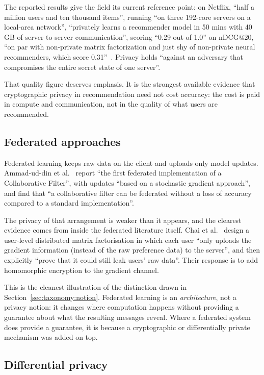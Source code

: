 The reported results give the field its current reference point: on Netflix, ``half a million
users and ten thousand items'', running ``on three 192-core servers on a local-area network'',
\nudgeplain{} ``privately learns a recommender model in 50 mins with 40 GB of server-to-server
communication'', scoring ``0.29 out of 1.0'' on nDCG@20, ``on par with non-private matrix
factorization and just shy of non-private neural recommenders, which score
0.31''~\cite{nudge2026}. Privacy holds ``against an adversary that compromises the entire secret
state of one server''.

That quality figure deserves emphasis. It is the strongest available evidence that cryptographic
privacy in recommendation need not cost accuracy: the cost is paid in compute and
communication, not in the quality of what users are recommended.

\subsection{Federated approaches}
\label{sec:training:fed}

Federated learning keeps raw data on the client and uploads only model updates. Ammad-ud-din et
al.~\cite{ammadudin2019} report ``the first federated implementation of a Collaborative Filter'',
with updates ``based on a stochastic gradient approach'', and find that ``a collaborative filter
can be federated without a loss of accuracy compared to a standard implementation''.

The privacy of that arrangement is weaker than it appears, and the clearest evidence comes from
inside the federated literature itself. Chai et al.~\cite{chai2021} design a user-level
distributed matrix factorisation in which each user ``only uploads the gradient information
(instead of the raw preference data) to the server'', and then explicitly ``prove that it could
still leak users' raw data''. Their response is to add homomorphic encryption to the gradient
channel.

This is the cleanest illustration of the distinction drawn in
Section~\ref{sec:taxonomy:notion}. Federated learning is an \emph{architecture}, not a privacy
notion: it changes where computation happens without providing a guarantee about what the
resulting messages reveal. Where a federated system does provide a guarantee, it is because a
cryptographic or differentially private mechanism was added on top.

\subsection{Differential privacy}
\label{sec:training:dp}


